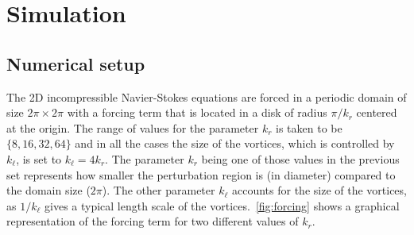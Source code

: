 \documentclass[../main.tex]{subfiles}
\begin{document}
\section{Simulation}\label{sec:results0}
\subsection{Numerical setup}\label{sec:numerical}
The 2D incompressible Navier-Stokes equations are forced in a periodic domain of size $2\pi \times 2\pi$ with a forcing term that is located in a disk of radius $\pi/k_r$ centered at the origin.  The range of values for the parameter $k_r$ is taken to be $\{8, 16, 32, 64\}$ and in all the cases the size of the vortices, which is controlled by $k_\ell$, is set to $k_\ell = 4 k_r$. The parameter $k_r$ being one of those values in the previous set represents how smaller the perturbation region is (in diameter) compared to the domain size ($2\pi$). The other parameter $k_\ell$ accounts for the size of the vortices, as $1/k_\ell$ gives a typical length scale of the vortices.~\cref{fig:forcing} shows a graphical representation of the forcing term for two different values of $k_r$.
\end{document}
